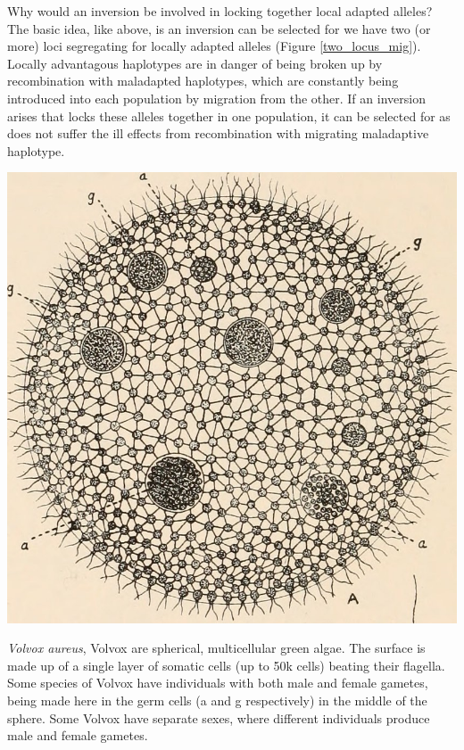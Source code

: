 Why would an inversion be involved in locking together local adapted alleles? The basic idea, like above, is an inversion can be selected for we have two (or more) loci segregating for locally adapted alleles (Figure \ref{two_locus_mig}). Locally advantagous haplotypes are in danger of being broken up by recombination with maladapted haplotypes, which are constantly being
introduced into each population by migration from the other. If an inversion arises that locks these alleles together in one population, it can be selected for as does not suffer the ill effects from recombination with migrating maladaptive haplotype. 
 
  \begin{marginfigure}[-6cm]
\begin{center}
\includegraphics[width = \textwidth]{illustration_images/multiple_sel_loci/volvox/volvox.jpg}
\end{center}
\caption{ {\it Volvox aureus}, Volvox are spherical, multicellular green algae. The surface is made up of a single layer of somatic cells (up to 50k cells) beating their flagella. Some species of Volvox have individuals with both male and female gametes, being made here in the germ cells (a and g respectively) in the middle of the sphere. Some Volvox have separate sexes, where different individuals produce male and female gametes.}
\end{marginfigure}
